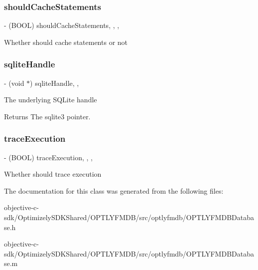 \subsubsection{\texorpdfstring{should\+Cache\+Statements}{shouldCacheStatements}}
{\footnotesize\ttfamily -\/ (B\+O\+OL) should\+Cache\+Statements\hspace{0.3cm}{\ttfamily [read]}, {\ttfamily [write]}, {\ttfamily [nonatomic]}, {\ttfamily [assign]}}

Whether should cache statements or not \mbox{\label{interface_o_p_t_l_y_f_m_d_b_database_ac63c7ff97fef8256e42d286f0f9962de}} 
\subsubsection{\texorpdfstring{sqlite\+Handle}{sqliteHandle}}
{\footnotesize\ttfamily -\/ (void $\ast$) sqlite\+Handle\hspace{0.3cm}{\ttfamily [read]}, {\ttfamily [nonatomic]}, {\ttfamily [assign]}}

The underlying S\+Q\+Lite handle

\begin{DoxyReturn}{Returns}
The {\ttfamily sqlite3} pointer. 
\end{DoxyReturn}
\mbox{\label{interface_o_p_t_l_y_f_m_d_b_database_a498285315912a9465dd182db98395f14}} 
\subsubsection{\texorpdfstring{trace\+Execution}{traceExecution}}
{\footnotesize\ttfamily -\/ (B\+O\+OL) trace\+Execution\hspace{0.3cm}{\ttfamily [read]}, {\ttfamily [write]}, {\ttfamily [atomic]}, {\ttfamily [assign]}}

Whether should trace execution 

The documentation for this class was generated from the following files\+:\begin{DoxyCompactItemize}
\item 
objective-\/c-\/sdk/\+Optimizely\+S\+D\+K\+Shared/\+O\+P\+T\+L\+Y\+F\+M\+D\+B/src/optlyfmdb/O\+P\+T\+L\+Y\+F\+M\+D\+B\+Database.\+h\item 
objective-\/c-\/sdk/\+Optimizely\+S\+D\+K\+Shared/\+O\+P\+T\+L\+Y\+F\+M\+D\+B/src/optlyfmdb/O\+P\+T\+L\+Y\+F\+M\+D\+B\+Database.\+m\end{DoxyCompactItemize}
